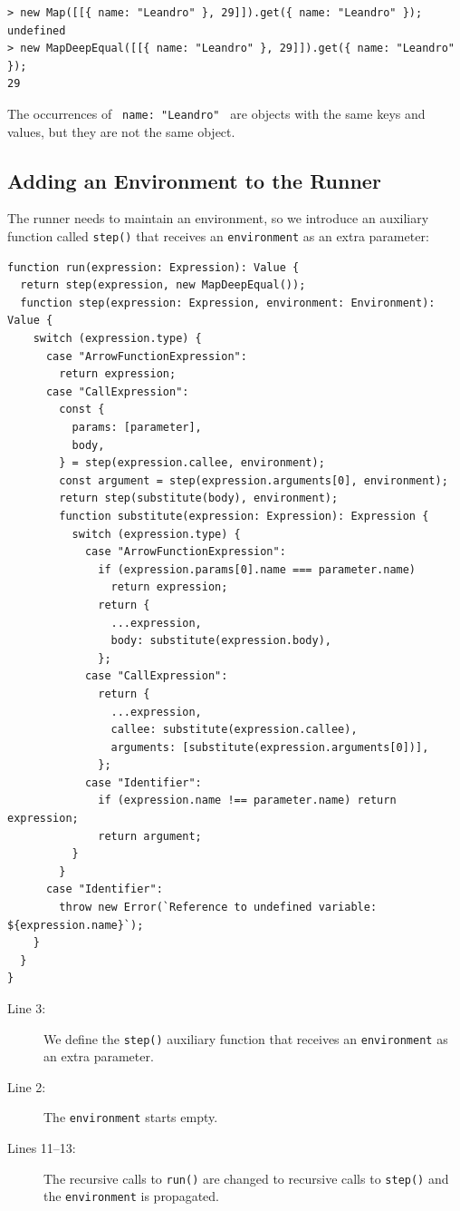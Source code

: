 \documentclass[12pt, oneside]{book}
\begin{document}
\begin{verbatim}
> new Map([[{ name: "Leandro" }, 29]]).get({ name: "Leandro" });
undefined
> new MapDeepEqual([[{ name: "Leandro" }, 29]]).get({ name: "Leandro" });
29
\end{verbatim}

The occurrences of \texttt{{ name: "Leandro" }} are objects with the same keys and values, but they are not the same object.

\subsection{Adding an Environment to the Runner}

The runner needs to maintain an environment, so we introduce an auxiliary function called \texttt{step()} that receives an \texttt{environment} as an extra parameter:

\begin{verbatim}
function run(expression: Expression): Value {
  return step(expression, new MapDeepEqual());
  function step(expression: Expression, environment: Environment): Value {
    switch (expression.type) {
      case "ArrowFunctionExpression":
        return expression;
      case "CallExpression":
        const {
          params: [parameter],
          body,
        } = step(expression.callee, environment);
        const argument = step(expression.arguments[0], environment);
        return step(substitute(body), environment);
        function substitute(expression: Expression): Expression {
          switch (expression.type) {
            case "ArrowFunctionExpression":
              if (expression.params[0].name === parameter.name)
                return expression;
              return {
                ...expression,
                body: substitute(expression.body),
              };
            case "CallExpression":
              return {
                ...expression,
                callee: substitute(expression.callee),
                arguments: [substitute(expression.arguments[0])],
              };
            case "Identifier":
              if (expression.name !== parameter.name) return expression;
              return argument;
          }
        }
      case "Identifier":
        throw new Error(`Reference to undefined variable: ${expression.name}`);
    }
  }
}
\end{verbatim}

\begin{description}
\item [Line 3:] We define the \texttt{step()} auxiliary function that receives an \texttt{environment} as an extra parameter.

\item [Line 2:] The \texttt{environment} starts empty.

\item [Lines 11–13:] The recursive calls to \texttt{run()} are changed to recursive calls to \texttt{step()} and the \texttt{environment} is propagated.
\end{description}
\end{document}
